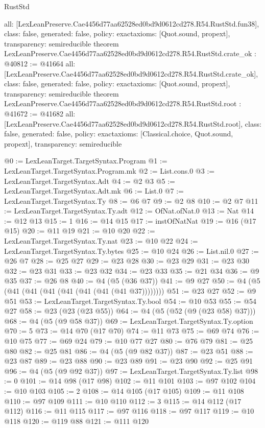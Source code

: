 \begin{lexlean}{RustStd}
\begin{coremodule}
{  all: [LexLeanPreserve.Cae4456d77aa62528ed0bd9d0612cd278.R54.RustStd.fun38],
  class: false,
  generated: false,
  policy: exact{axioms: [Quot.sound, propext]},
  transparency: semireducible
}
theorem LexLeanPreserve.Cae4456d77aa62528ed0bd9d0612cd278.R54.RustStd.crate_ok : @40812 := @41664 {
  all: [LexLeanPreserve.Cae4456d77aa62528ed0bd9d0612cd278.R54.RustStd.crate_ok],
  class: false,
  generated: false,
  policy: exact{axioms: [Quot.sound, propext]},
  transparency: semireducible
}
theorem LexLeanPreserve.Cae4456d77aa62528ed0bd9d0612cd278.R54.RustStd.root : @41672 := @41682 {
  all: [LexLeanPreserve.Cae4456d77aa62528ed0bd9d0612cd278.R54.RustStd.root],
  class: false,
  generated: false,
  policy: exact{axioms: [Classical.choice, Quot.sound, propext]},
  transparency: semireducible
}

@0 := LexLeanTarget.TargetSyntax.Program
@1 := LexLeanTarget.TargetSyntax.Program.mk
@2 := List.cons.{0}
@3 := LexLeanTarget.TargetSyntax.Adt
@4 := @2 @3
@5 := LexLeanTarget.TargetSyntax.Adt.mk
@6 := List.{0}
@7 := LexLeanTarget.TargetSyntax.Ty
@8 := @6 @7
@9 := @2 @8
@10 := @2 @7
@11 := LexLeanTarget.TargetSyntax.Ty.adt
@12 := OfNat.ofNat.{0}
@13 := Nat
@14 := @12 @13
@15 := 1
@16 := @14 @15
@17 := instOfNatNat
@19 := @16 (@17 @15)
@20 := @11 @19
@21 := @10 @20
@22 := LexLeanTarget.TargetSyntax.Ty.nat
@23 := @10 @22
@24 := LexLeanTarget.TargetSyntax.Ty.bytes
@25 := @10 @24
@26 := List.nil.{0}
@27 := @26 @7
@28 := @25 @27
@29 := @23 @28
@30 := @23 @29
@31 := @23 @30
@32 := @23 @31
@33 := @23 @32
@34 := @23 @33
@35 := @21 @34
@36 := @9 @35
@37 := @26 @8
@40 := @4 (@5 (@36 @37))
@41 := @9 @27
@50 := @4 (@5 (@41 (@41 (@41 (@41 (@41 (@41 (@41 @37))))))))
@51 := @23 @27
@52 := @9 @51
@53 := LexLeanTarget.TargetSyntax.Ty.bool
@54 := @10 @53
@55 := @54 @27
@58 := @23 (@23 (@23 @55))
@64 := @4 (@5 (@52 (@9 (@23 @58) @37)))
@68 := @4 (@5 (@9 @58 @37))
@69 := LexLeanTarget.TargetSyntax.Ty.option
@70 := 5
@73 := @14 @70 (@17 @70)
@74 := @11 @73
@75 := @69 @74
@76 := @10 @75
@77 := @69 @24
@79 := @10 @77 @27
@80 := @76 @79
@81 := @25 @80
@82 := @25 @81
@86 := @4 (@5 (@9 @82 @37))
@87 := @23 @51
@88 := @23 @87
@89 := @23 @88
@90 := @23 @89
@91 := @23 @90
@92 := @25 @91
@96 := @4 (@5 (@9 @92 @37))
@97 := LexLeanTarget.TargetSyntax.Ty.list
@98 := 0
@101 := @14 @98 (@17 @98)
@102 := @11 @101
@103 := @97 @102
@104 := @10 @103
@105 := 2
@108 := @14 @105 (@17 @105)
@109 := @11 @108
@110 := @97 @109
@111 := @10 @110
@112 := 3
@115 := @14 @112 (@17 @112)
@116 := @11 @115
@117 := @97 @116
@118 := @97 @117
@119 := @10 @118
@120 := @119 @88
@121 := @111 @120

\end{coremodule}
\end{lexlean}
